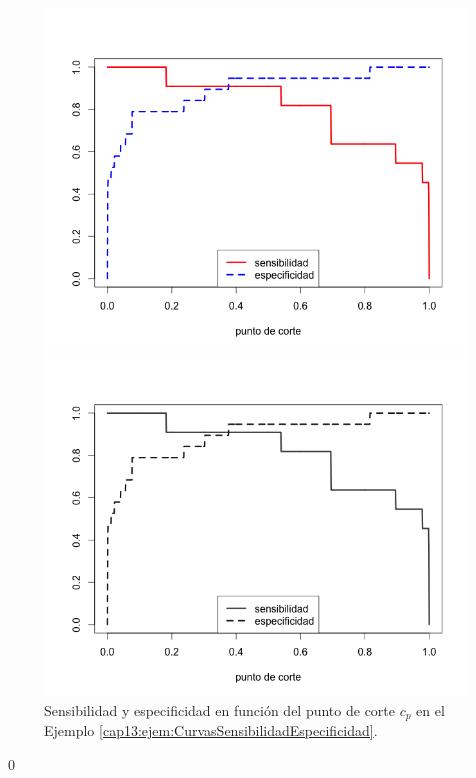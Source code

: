 \begin{ejemplo}
\begin{figure}[h!]
\begin{center}
\begin{enColor}
\includegraphics[width=13cm]{../fig/Cap13-CurvasSensibilidadEspecificidad.png}
\end{enColor}
\begin{bn}
\includegraphics[width=13cm]{../fig/Cap13-CurvasSensibilidadEspecificidad-bn.png}
\end{bn}
\caption{Sensibilidad y especificidad en función del punto de corte
$c_p$ en el Ejemplo \ref{cap13:ejem:CurvasSensibilidadEspecificidad}. }
\label{cap13:fig:CurvasSensibilidadEspecificidad}
\end{center}
\end{figure}

\qed
\end{ejemplo}

